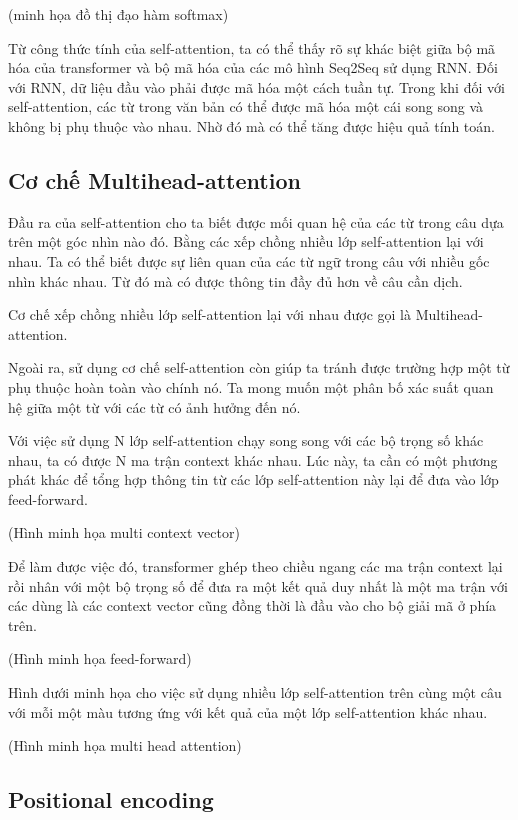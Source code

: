 (minh họa đồ thị đạo hàm softmax)

Từ công thức tính của self-attention, ta có thể thấy rõ sự khác biệt giữa bộ mã hóa của transformer và bộ mã hóa của các mô hình Seq2Seq sử dụng RNN. Đối với RNN, dữ liệu đầu vào phải được mã hóa một cách tuần tự. Trong khi đối với self-attention, các từ trong văn bản có thể được mã hóa một cái song song và không bị phụ thuộc vào nhau. Nhờ đó mà có thể tăng được hiệu quả tính toán.

\subsection{Cơ chế Multihead-attention}
Đầu ra của self-attention cho ta biết được mối quan hệ của các từ trong câu dựa trên một góc nhìn nào đó. Bằng các xếp chồng nhiều lớp self-attention lại với nhau. Ta có thể biết được sự liên quan của các từ ngữ trong câu với nhiều gốc nhìn khác nhau. Từ đó mà có được thông tin đầy đủ hơn về câu cần dịch. 

Cơ chế xếp chồng nhiều lớp self-attention lại với nhau được gọi là Multihead-attention. 

Ngoài ra, sử dụng cơ chế self-attention còn giúp ta tránh được trường hợp một từ phụ thuộc hoàn toàn vào chính nó. Ta mong muốn một phân bố xác suất quan hệ giữa một từ với các từ có ảnh hưởng đến nó.

Với việc sử dụng N lớp self-attention chạy song song với các bộ trọng số khác nhau, ta có được N ma trận context khác nhau. Lúc này, ta cần có một phương phát khác để tổng hợp thông tin từ các lớp self-attention này lại để đưa vào lớp feed-forward. 

(Hình minh họa multi context vector)

Để làm được việc đó, transformer ghép theo chiều ngang các ma trận context lại rồi nhân với một bộ trọng số để đưa ra một kết quả duy nhất là một ma trận với các dùng là các context vector cũng đồng thời là đầu vào cho bộ giải mã ở phía trên.

(Hình minh họa feed-forward)

Hình dưới minh họa cho việc sử dụng nhiều lớp self-attention trên cùng một câu với mỗi một màu tương ứng với kết quả của một lớp self-attention khác nhau.

(Hình minh họa multi head attention)

\subsection{Positional encoding}

